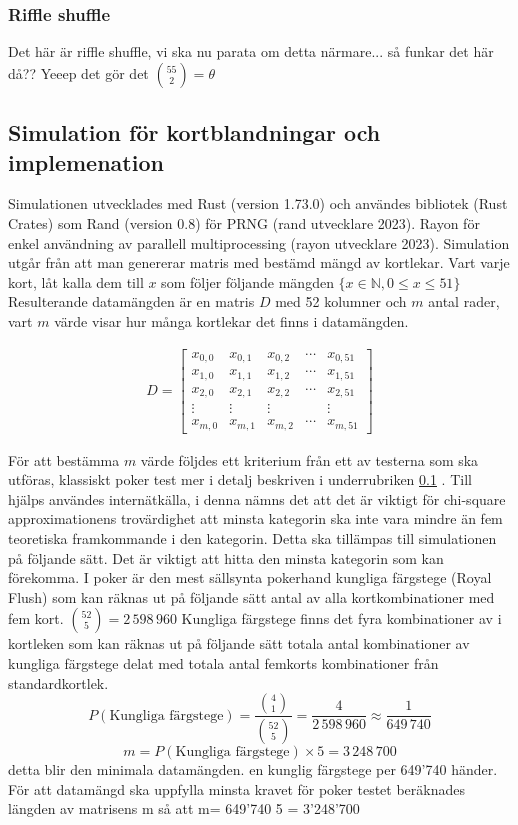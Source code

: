 \documentclass[a4paper]{article}
\begin{document}
\subsubsection{Riffle shuffle}
Det här är riffle shuffle, vi ska nu parata om detta närmare...
så funkar det här då?? Yeeep det gör det $\binom{55}{2} = \theta$
\subsection{Simulation för kortblandningar och implemenation}
\label{sec:poker_test}

Simulationen utvecklades med Rust (version 1.73.0) och användes bibliotek (Rust
Crates) som Rand (version 0.8) för PRNG (rand utvecklare 2023). Rayon för enkel
användning av  parallell multiprocessing (rayon utvecklare 2023). Simulation
utgår från att man genererar matris med bestämd mängd av kortlekar. Vart varje
kort, låt kalla dem till $x$ som följer följande mängden $\{x \in \mathbb{N},  0 \leq x \leq 51 \}$
Resulterande datamängden är en matris $D$ med 52 kolumner och $m$ antal rader, vart
$m$ värde visar hur många kortlekar det finns i datamängden.

\begin{align}
	D = \begin{bmatrix}
		x_{0,0} & x_{0,1} & x_{0,2} & \cdots & x_{0,51}\\ 
		x_{1,0} & x_{1,1} & x_{1,2} & \cdots & x_{1,51}\\
		x_{2,0} & x_{2,1} & x_{2,2} & \cdots & x_{2,51}\\
		\vdots & \vdots & \vdots & \; & \vdots \\
		x_{m,0} & x_{m,1} & x_{m,2} & \cdots & x_{m,51}
	\end{bmatrix}
\end{align}

För att bestämma $m$ värde följdes ett kriterium från ett av testerna som ska
utföras, klassiskt poker test mer i  detalj beskriven i underrubriken \ref{sec:poker_test} .
Till hjälps användes \parencite{nist} internätkälla, i denna nämns det att det
är viktigt för chi-square approximationens trovärdighet att minsta kategorin
ska inte vara mindre än fem teoretiska framkommande i den kategorin.
Detta ska tillämpas till simulationen på följande sätt. Det
är viktigt att hitta den minsta kategorin som kan förekomma. I poker är den
mest sällsynta pokerhand kungliga färgstege (Royal Flush) som kan räknas ut på
följande sätt antal av alla kortkombinationer med fem kort.
$\binom{52}{5} = 2\,598\,960$ 
Kungliga färgstege finns det fyra  kombinationer av i kortleken
som kan räknas ut på följande sätt totala antal kombinationer av kungliga
färgstege delat med totala antal femkorts kombinationer från standardkortlek.
$$ P(\text{Kungliga färgstege}) =  \frac{\binom{4}{1}}{\binom{52}{5}} = \frac{4}{2\,598\,960} \approx 
\frac{1}{649\,740} $$ 
$$m = P(\text{Kungliga färgstege})  \times 5 = 3\,248\,700$$ detta blir den
minimala datamängden. 
en kunglig färgstege per 649'740 händer. För
att datamängd ska uppfylla minsta kravet för poker testet beräknades längden
av matrisens m  så att m= 649'740 5 = 3’248’700
\end{document}

